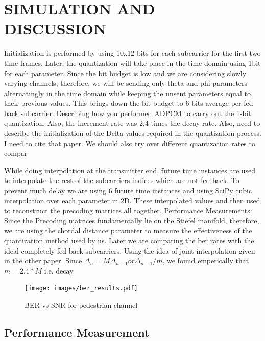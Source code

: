 \documentclass[conference]{IEEEtran}
\begin{document}
\section{SIMULATION AND DISCUSSION}
\label{section3}

Initialization is performed by using 10x12 bits for each subcarrier for the first two time frames. Later, the quantization will take place in the time-domain using 1bit for each parameter. Since the bit budget is low and we are considering slowly varying channels, therefore, we will be sending only theta and phi parameters alternatingly in the time domain while keeping the unsent parameters equal to their previous values. This brings down the bit budget to 6 bits average per fed back subcarrier. 
Describing how you performed ADPCM to carry out the 1-bit quantization. Also, the increment rate was 2.4 times the decay rate. Also, need to describe the initialization of the Delta values required in the quantization process. I need to cite that paper. We should also try over different quantization rates to compar \cite{Gupt1905}

While doing interpolation at the transmitter end, future time instances are used to interpolate the rest of the subcarriers indices which are not fed back. To prevent much delay we are using 6 future time instances and using SciPy cubic interpolation over each parameter in 2D. These interpolated values and then used to reconstruct the precoding matrices all together.
Performance Measurements:
Since the Precoding matrices fundamentally lie on the Stiefel manifold, therefore, we are using the chordal distance parameter to measure the effectiveness of the quantization method used by us. Later we are comparing the ber rates with the ideal completely fed back subcarriers.
Using the idea of joint interpolation given in the other paper.  
Since $\Delta_{n} = M\Delta_{n-1} or \Delta_{n-1}/m $, we found emperically that $m=2.4*M$ i.e. decay

\begin{figure}
\texttt{[image: images/ber\_results.pdf]}

\caption{BER vs SNR for pedestrian channel} 
\label{ber_overview}
\vspace{-5pt}
\end{figure}

\subsection{Performance Measurement}
\label{setting}
\end{document}
